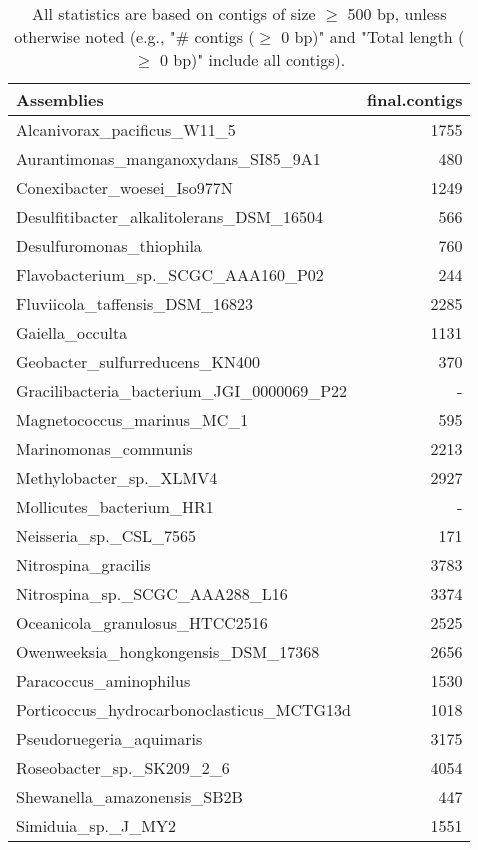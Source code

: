 \documentclass[12pt,a4paper]{article}
\begin{document}
\begin{table}[ht]
\begin{center}
\caption{All statistics are based on contigs of size $\geq$ 500 bp, unless otherwise noted (e.g., "\# contigs ($\geq$ 0 bp)" and "Total length ($\geq$ 0 bp)" include all contigs).}
\begin{tabular}{|l*{1}{|r}|}
\hline
Assemblies & final.contigs \\ \hline
Alcanivorax\_pacificus\_W11\_5 & 1755 \\ \hline
Aurantimonas\_manganoxydans\_SI85\_9A1 & 480 \\ \hline
Conexibacter\_woesei\_Iso977N & 1249 \\ \hline
Desulfitibacter\_alkalitolerans\_DSM\_16504 & 566 \\ \hline
Desulfuromonas\_thiophila & 760 \\ \hline
Flavobacterium\_sp.\_SCGC\_AAA160\_P02 & 244 \\ \hline
Fluviicola\_taffensis\_DSM\_16823 & 2285 \\ \hline
Gaiella\_occulta & 1131 \\ \hline
Geobacter\_sulfurreducens\_KN400 & 370 \\ \hline
Gracilibacteria\_bacterium\_JGI\_0000069\_P22 & - \\ \hline
Magnetococcus\_marinus\_MC\_1 & 595 \\ \hline
Marinomonas\_communis & 2213 \\ \hline
Methylobacter\_sp.\_XLMV4 & 2927 \\ \hline
Mollicutes\_bacterium\_HR1 & - \\ \hline
Neisseria\_sp.\_CSL\_7565 & 171 \\ \hline
Nitrospina\_gracilis & 3783 \\ \hline
Nitrospina\_sp.\_SCGC\_AAA288\_L16 & 3374 \\ \hline
Oceanicola\_granulosus\_HTCC2516 & 2525 \\ \hline
Owenweeksia\_hongkongensis\_DSM\_17368 & 2656 \\ \hline
Paracoccus\_aminophilus & 1530 \\ \hline
Porticoccus\_hydrocarbonoclasticus\_MCTG13d & 1018 \\ \hline
Pseudoruegeria\_aquimaris & 3175 \\ \hline
Roseobacter\_sp.\_SK209\_2\_6 & 4054 \\ \hline
Shewanella\_amazonensis\_SB2B & 447 \\ \hline
Simiduia\_sp.\_J\_MY2 & 1551 \\ \hline

\end{tabular}
\end{center}
\end{table}
\end{document}
